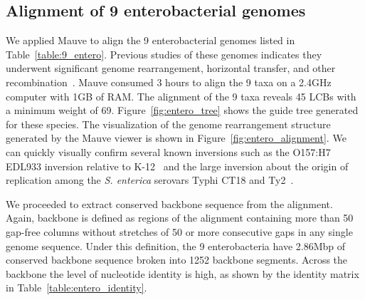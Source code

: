 \documentclass[titlepage,11pt]{article}
\begin{document}
\subsection*{Alignment of 9 enterobacterial genomes}
We applied Mauve to align the 9 enterobacterial genomes listed in
Table~\ref{table:9_entero}.  Previous studies of these genomes indicates they
underwent significant genome rearrangement, horizontal transfer, and other
recombination~\citep{o157,styphi2}.  Mauve consumed 3 hours to align the 9 taxa
on a 2.4GHz computer with 1GB of RAM.  The alignment of the 9 taxa reveals
 45 LCBs with a minimum weight of 69.  
Figure~\ref{fig:entero_tree} shows the guide tree generated for these species.
The visualization of the genome rearrangement structure generated by the Mauve
viewer is shown in Figure~\ref{fig:entero_alignment}.  We can quickly visually
confirm several known inversions such as the O157:H7 EDL933 inversion relative
to K-12~\citep{o157} 
and the large inversion about the
origin of replication among the
\textit{S. enterica} serovars Typhi CT18 and Ty2~\citep{styphi2}.

We proceeded to extract conserved backbone sequence from the alignment.  Again,
backbone is defined as regions of the alignment containing more than 50 gap-free
columns without stretches of 50 or more consecutive gaps in any single genome
sequence.  Under this definition, the 9 enterobacteria have 2.86Mbp of conserved
backbone sequence broken into 1252 backbone segments.  Across the backbone the
level of nucleotide identity is high, as shown by the identity matrix in
Table~\ref{table:entero_identity}.  
\end{document}
